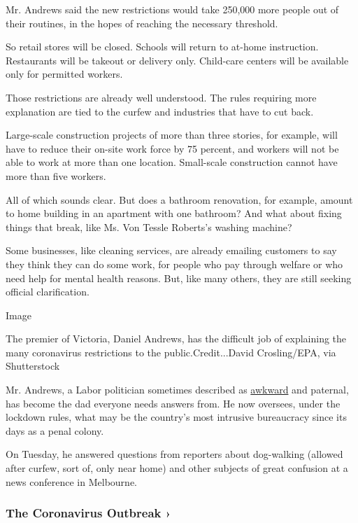 Mr. Andrews said the new restrictions would take 250,000 more people out
of their routines, in the hopes of reaching the necessary threshold.

So retail stores will be closed. Schools will return to at-home
instruction. Restaurants will be takeout or delivery only. Child-care
centers will be available only for permitted workers.

Those restrictions are already well understood. The rules requiring more
explanation are tied to the curfew and industries that have to cut back.

Large-scale construction projects of more than three stories, for
example, will have to reduce their on-site work force by 75 percent, and
workers will not be able to work at more than one location. Small-scale
construction cannot have more than five workers.

All of which sounds clear. But does a bathroom renovation, for example,
amount to home building in an apartment with one bathroom? And what
about fixing things that break, like Ms. Von Tessle Roberts's washing
machine?

Some businesses, like cleaning services, are already emailing customers
to say they think they can do some work, for people who pay through
welfare or who need help for mental health reasons. But, like many
others, they are still seeking official clarification.

Image

The premier of Victoria, Daniel Andrews, has the difficult job of
explaining the many coronavirus restrictions to the
public.Credit...David Crosling/EPA, via Shutterstock

Mr. Andrews, a Labor politician sometimes described as
\href{https://www.theage.com.au/national/victoria/the-strange-feeling-i-have-when-i-watch-daniel-andrews-20200710-p55av5.html}{awkward}
and paternal, has become the dad everyone needs answers from. He now
oversees, under the lockdown rules, what may be the country's most
intrusive bureaucracy since its days as a penal colony.

On Tuesday, he answered questions from reporters about dog-walking
(allowed after curfew, sort of, only near home) and other subjects of
great confusion at a news conference in Melbourne.

\href{https://www.nytimes3xbfgragh.onion/news-event/coronavirus?action=click\&pgtype=Article\&state=default\&region=MAIN_CONTENT_3\&context=storylines_faq}{}

\hypertarget{the-coronavirus-outbreak-}{%
\subsubsection{The Coronavirus Outbreak
›}\label{the-coronavirus-outbreak-}}

